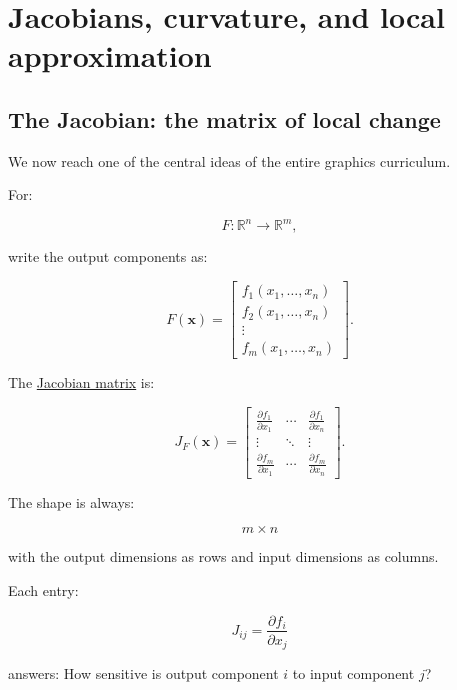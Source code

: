 \section{Jacobians, curvature, and local approximation}\label{02-foundations-ii-ch021-jacobians-curvature-and-local-approximation}

\hypertarget{02-foundations-ii-ch021-jacobians-curvature-and-local-approximation}{}

\subsection{The Jacobian: the matrix of local change}\label{02-foundations-ii-ch021-the-jacobian-the-matrix-of-local-change}

\hypertarget{02-foundations-ii-ch021-the-jacobian-the-matrix-of-local-change}{}

We now reach one of the central ideas of the entire graphics curriculum.

For:

\[
F:\mathbb R^n\rightarrow\mathbb R^m,
\]

write the output components as:

\[
F(\mathbf x)= \begin{bmatrix} f_1(x_1,\ldots,x_n)\\ f_2(x_1,\ldots,x_n)\\ \vdots\\ f_m(x_1,\ldots,x_n) \end{bmatrix}.
\]

The \hyperref[02-foundations-ii-ch021-jacobians-curvature-and-local-approximation]{Jacobian matrix} is:

\[
\boxed{ J_F(\mathbf x)= \begin{bmatrix} \frac{\partial f_1}{\partial x_1}&\cdots& \frac{\partial f_1}{\partial x_n}\\ \vdots&\ddots&\vdots\\ \frac{\partial f_m}{\partial x_1}&\cdots& \frac{\partial f_m}{\partial x_n} \end{bmatrix} }.
\]

The shape is always:

\[
\boxed{m\times n}
\]

with the output dimensions as rows and input dimensions as columns.

Each entry:

\[
J_{ij}=\frac{\partial f_i}{\partial x_j}
\]

answers: How sensitive is output component \(i\) to input component \(j\)?

